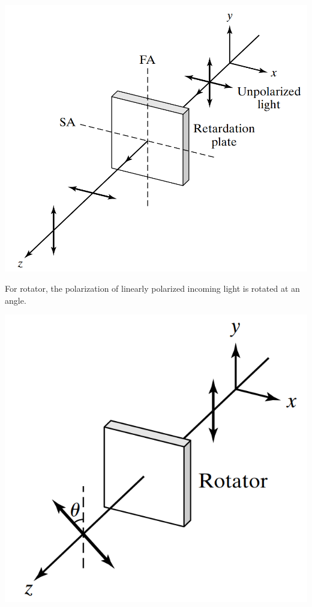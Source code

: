 \documentclass[11pt]{book}
\theoremstyle{break}
\theoremstyle{break}
\begin{document}
\begin{center}
\includegraphics[scale=0.35]{retarder}
\end{center}
\newpage
For rotator, the polarization of linearly polarized incoming light is rotated at an angle.
\begin{center}
\includegraphics[scale=0.39]{rotator}
\end{center}
\end{document}
